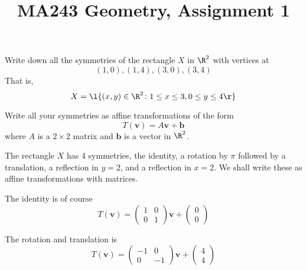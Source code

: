 \documentclass[a4paper]{article}
\title{MA243 Geometry, Assignment 1}
\begin{document}
\maketitle

\setlength{\parindent}{0em}
\setlength{\parskip}{1em}


\begin{questionbody}
Write down all the symmetries of the rectangle $X$ in $\R^2$ with vertices at \[
(1, 0), (1, 4), (3, 0), (3, 4)
\] That is, \[
X = \l\{ (x, y) \in \R^2 \colon 1 \le x \le 3, 0 \le y \le 4 \r\}
\]

Write all your symmetries as affine transformations of the form \[
T(\mathbf v) = A \mathbf v + \mathbf b
\] where $A$ is a $2 \times 2$ matrix and $\mathbf b$ is a vector in $\R^2$.
\end{questionbody}

\begin{center}
\end{center}

The rectangle $X$ has 4 symmetries, the identity, a rotation by $\pi$ followed by a translation, a reflection in $y=2$, and a reflection in $x=2$. We shall write these as affine transformations with matrices.

The identity is of course \[ T(\mathbf v) = \begin{pmatrix} 1 & 0 \\ 0 & 1 \end{pmatrix} \mathbf v + \begin{pmatrix} 0 \\ 0 \end{pmatrix} \]

The rotation and translation is \[ T(\mathbf v) = \begin{pmatrix} -1 & 0 \\ 0 & -1 \end{pmatrix} \mathbf v + \begin{pmatrix} 4 \\ 4 \end{pmatrix} \]
\end{document}
